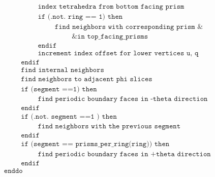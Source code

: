 \documentclass[./main.tex]{subfiles}
\begin{document}
\begin{align*}
&\hspace{3cm} \texttt{index tetrahedra from bottom facing prism}\nonumber\\
&\hspace{3cm} \texttt{if (.not. ring == 1) then}\nonumber\\
&\hspace{4cm} \texttt{find neighbors with corresponding prism \&}\nonumber\\
&\hspace{5cm} \texttt{\& in top\_facing\_prisms}\nonumber\\
&\hspace{3cm} \texttt{endif}\nonumber\\
&\hspace{3cm} \texttt{increment index offset for lower vertices u, q}\nonumber\\
&\hspace{2cm} \texttt{endif}\nonumber\\
&\hspace{2cm} \texttt{find internal neighbors}\nonumber\\
&\hspace{2cm} \texttt{find neighbors to adjacent phi slices}\nonumber\\
&\hspace{2cm} \texttt{if (segment ==1) then}\nonumber\\
&\hspace{3cm} \texttt{find periodic boundary faces in -theta direction}\nonumber\\
&\hspace{2cm} \texttt{endif}\nonumber\\
&\hspace{2cm} \texttt{if (.not. segment ==1 ) then}\nonumber\\
&\hspace{3cm} \texttt{find neighbors with the previous segment}\nonumber\\
&\hspace{2cm} \texttt{endif}\nonumber\\
&\hspace{2cm} \texttt{if (segment == prisms\_per\_ring(ring)) then}\nonumber\\
&\hspace{3cm} \texttt{find periodic boundary faces in +theta direction}\nonumber\\
&\hspace{2cm} \texttt{endif}\nonumber\\
&\hspace{1cm} \texttt{enddo}\nonumber\\
\end{align*}
\end{document}
